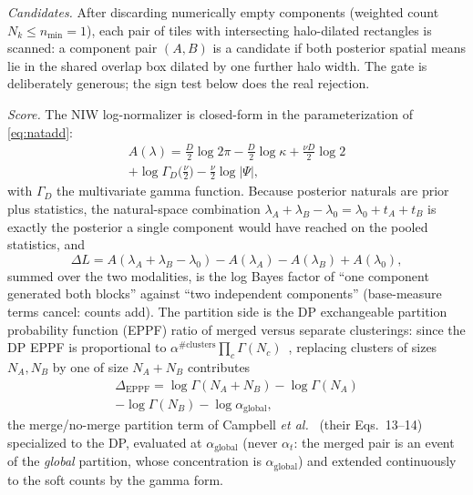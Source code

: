 \emph{Candidates.} After discarding numerically empty components
(weighted count $N_k \le n_{\min} = 1$), each pair
of tiles with intersecting halo-dilated rectangles is scanned: a
component pair $(A, B)$ is a candidate if both posterior spatial means
lie in the shared overlap box dilated by one further halo width. The
gate is deliberately generous; the sign test below does the real
rejection.

\emph{Score.} The NIW log-normalizer is closed-form in the
parameterization of \eqref{eq:natadd}:
\begin{multline}
A(\lambda) = \tfrac{D}{2}\log 2\pi - \tfrac{D}{2}\log\kappa
+ \tfrac{\nu D}{2}\log 2 \\
+ \log \Gamma_D\!\big(\tfrac{\nu}{2}\big)
- \tfrac{\nu}{2}\log\lvert\Psi\rvert,
\label{eq:lognorm}
\end{multline}
with $\Gamma_D$ the multivariate gamma function. Because posterior
naturals are prior plus statistics, the natural-space combination
$\lambda_A + \lambda_B - \lambda_0 = \lambda_0 + t_A + t_B$ is exactly the
posterior a single component would have reached on the pooled statistics,
and
\begin{equation}
\Delta L = A(\lambda_A + \lambda_B - \lambda_0)
- A(\lambda_A) - A(\lambda_B) + A(\lambda_0),
\label{eq:score}
\end{equation}
summed over the two modalities, is the log Bayes factor of ``one component
generated both blocks'' against ``two independent components''
(base-measure terms cancel: counts add). The partition side is
the DP exchangeable partition probability function (EPPF) ratio of
merged versus separate
clusterings: since the DP EPPF is proportional to
$\alpha^{\#\mathrm{clusters}} \prod_c \Gamma(N_c)$~\cite{antoniak1974mixtures}, replacing clusters of sizes $N_A, N_B$ by one
of size $N_A + N_B$ contributes
\begin{multline}
\Delta_{\mathrm{EPPF}} = \log\Gamma(N_A + N_B) - \log\Gamma(N_A) \\
- \log\Gamma(N_B) - \log \alpha_{\mathrm{global}},
\label{eq:eppf}
\end{multline}
the merge/no-merge partition term of Campbell \emph{et al.}~\cite{campbell2015streaming} (their Eqs.~13--14) specialized to the DP,
evaluated at $\alpha_{\mathrm{global}}$ (never $\alpha_t$: the merged
pair is an event of the \emph{global} partition, whose concentration
is $\alpha_{\mathrm{global}}$) and extended
continuously to the soft counts by the gamma form.

